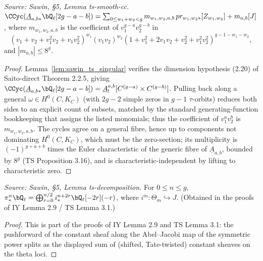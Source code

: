 \begin{lemma}
  \label{lem:sawin_ts_smooth_cc}
  \textit{Source: Sawin, §5, Lemma ts-smooth-cc.}
  $\CCyc(\underline A_{a,b*}\bQ_\ell[2g-a-b]) = \sum_{0\le w_1+w_2<g}
  m_{w_1,w_2,a,b}\,pr_{w_1,w_2*}[Z_{w_1,w_2}] + m_{a,b}[J]$, where
  $m_{w_1,w_2,a,b}$ is the coefficient of $v_1^{g-a}v_2^{g-b}$ in
  \[ (v_1+v_2+v_1^2v_2+v_1v_2^2)^{w_1}(v_1v_2)^{w_2}
     (1+v_1^2+2v_1v_2+v_2^2+v_1^2v_2^2)^{g-1-w_1-w_2}, \]
  and $|m_{a,b}|\le 8^g$.
\end{lemma}
\begin{proof}
  Lemma~\ref{lem:sawin_ts_singular} verifies the dimension hypothesis (2.20) of
  Saito-direct Theorem 2.2.5, giving $\CCyc(\underline A_{a,b*}\bQ_\ell[2g-a-b]) =
  \underline A^{a,b}_![C^{(g-a)}\times C^{(g-b)}]$.  Pulling back along a general
  $\omega\in H^0(C,K_C)$ (with $2g-2$ simple zeros in $g-1$ $\tau$-orbits) reduces
  both sides to an explicit count of subsets, matched by the standard
  generating-function bookkeeping that assigns the listed monomials; thus the
  coefficient of $v_1^av_2^b$ is $m_{w_1,w_2,a,b}$.  The cycles agree on a general
  fibre, hence up to components not dominating $H^0(C,K_C)$, which must be the
  zero-section; its multiplicity is $(-1)^{g+a+b}$ times the Euler characteristic
  of the generic fibre of $\underline A_{a,b}$, bounded by $8^g$ (TS Proposition
  3.16), and is characteristic-independent by lifting to characteristic zero.
\end{proof}

\begin{lemma}
  \label{lem:sawin_ts_decomposition}
  \textit{Source: Sawin, §5, Lemma ts-decomposition.}
  For $0\le n\le g$, $\pi^n_*\bQ_\ell = \bigoplus_{r=0}^{n/2}
  i^{n+2r}_*\bQ_\ell[-2r](-r)$, where $i^m:\Theta_m\hookrightarrow J$.  (Obtained
  in the proofs of IY Lemma 2.9 / TS Lemma 3.1.)
\end{lemma}
\begin{proof}
  This is part of the proofs of IY Lemma 2.9 and TS Lemma 3.1: the pushforward of
  the constant sheaf along the Abel--Jacobi map of the symmetric power splits as
  the displayed sum of (shifted, Tate-twisted) constant sheaves on the theta loci.
\end{proof}


